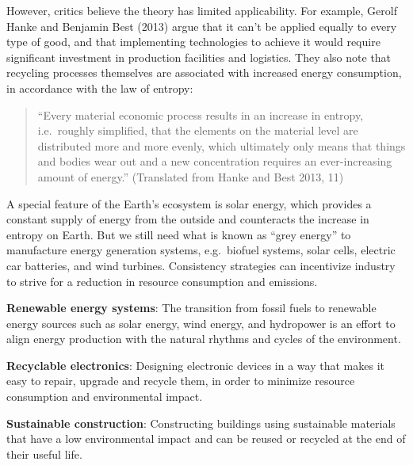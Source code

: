 \documentclass[
  a4paper,
  openany]{book}
\begin{document}
However, critics believe the theory has limited applicability. For
example, Gerolf Hanke and Benjamin Best (2013) argue that it can't be
applied equally to every type of good, and that implementing
technologies to achieve it would require significant investment in
production facilities and logistics. They also note that recycling
processes themselves are associated with increased energy consumption,
in accordance with the law of entropy:

\begin{quote}
``Every material economic process results in an increase in entropy,
i.e.~roughly simplified, that the elements on the material level are
distributed more and more evenly, which ultimately only means that
things and bodies wear out and a new concentration requires an
ever-increasing amount of energy.'' (Translated from Hanke and Best
2013, 11)
\end{quote}

A special feature of the Earth's ecosystem is solar energy, which
provides a constant supply of energy from the outside and counteracts
the increase in entropy on Earth. But we still need what is known as
``grey energy'' to manufacture energy generation systems, e.g.~biofuel
systems, solar cells, electric car batteries, and wind turbines.
Consistency strategies can incentivize industry to strive for a
reduction in resource consumption and emissions.

\begin{tcolorbox}[enhanced jigsaw, coltitle=black, bottomtitle=1mm, opacitybacktitle=0.6, titlerule=0mm, opacityback=0, leftrule=.75mm, colbacktitle=quarto-callout-tip-color!10!white, bottomrule=.15mm, toptitle=1mm, breakable, title={Putting Consistency Strategies into Action: Examples}, arc=.35mm, rightrule=.15mm, toprule=.15mm, left=2mm, colback=white, colframe=quarto-callout-tip-color-frame]

\textbf{Renewable energy systems}: The transition from fossil fuels to
renewable energy sources such as solar energy, wind energy, and
hydropower is an effort to align energy production with the natural
rhythms and cycles of the environment.

\textbf{Recyclable electronics}: Designing electronic devices in a way
that makes it easy to repair, upgrade and recycle them, in order to
minimize resource consumption and environmental impact.

\textbf{Sustainable construction}: Constructing buildings using
sustainable materials that have a low environmental impact and can be
reused or recycled at the end of their useful life.

\end{tcolorbox}
\end{document}
